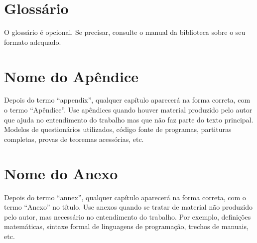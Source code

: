 \documentclass[tcc,baec]{unipampa}
\begin{document}
% 

%
%




\chapter*{Glossário}

O glossário é opcional. Se precisar, consulte o manual da biblioteca sobre o seu formato adequado.

\appendix

\chapter{Nome do Apêndice}

Depois do termo ``appendix'', qualquer capítulo aparecerá na forma correta, com o termo ``Apêndice''. Use apêndices quando houver material produzido pelo autor que ajuda no entendimento do trabalho mas que não faz parte do texto principal. Modelos de questionários utilizados, código fonte de programas, partituras completas, provas de teoremas acessórias, etc.

\annex

\chapter{Nome do Anexo}

Depois do termo ``annex'', qualquer capítulo aparecerá na forma correta, com o termo ``Anexo'' no título. Use anexos quando se tratar de material não produzido pelo autor, mas necessário no entendimento do trabalho. Por exemplo, definições matemáticas, sintaxe formal de linguagens de programação, trechos de manuais, etc.

%
%
\end{document}
